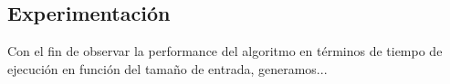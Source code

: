 \subsection{Experimentación}

Con el fin de observar la performance del algoritmo en términos de tiempo de ejecución en función del tamaño de entrada, generamos...
